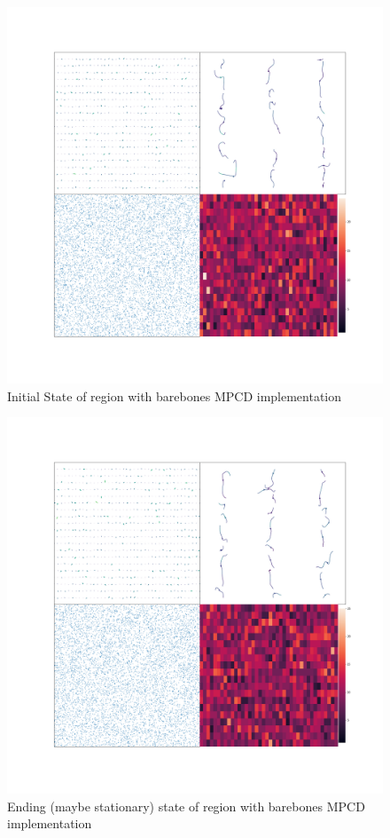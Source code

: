 \documentclass[
]{article}
\begin{document}
\begin{figure}
\centering
\includegraphics{Assets/initial_region.png}
\caption{Initial State of region with barebones MPCD implementation}
\end{figure}

\begin{figure}
\centering
\includegraphics{Assets/stationary_region.png}
\caption{Ending (maybe stationary) state of region with barebones MPCD
implementation}
\end{figure}
\end{document}
